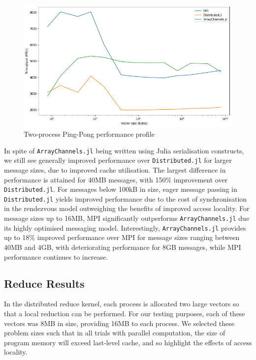 \begin{figure}[htb]
  \includegraphics[width=\linewidth]{figs/pingpong.png}
  \caption{Two-process Ping-Pong performance profile}
  \label{fig:plot-pingpong}
\end{figure}

In spite of \texttt{ArrayChannels.jl} being written using Julia
serialisation constructs, we still see generally improved performance
over \texttt{Distributed.jl} for larger message sizes, due to improved
cache utilisation. The largest difference in performance is attained for
40MB messages, with 150\% improvement over \texttt{Distributed.jl}. For
messages below 100kB in size, eager message passing in
\texttt{Distributed.jl} yields improved performance due to the cost of
synchronisation in the rendezvous model outweighing the benefits of
improved access locality. For message sizes up to 16MB, MPI
significantly outperforms \texttt{ArrayChannels.jl} due its highly
optimised messaging model. Interestingly, \texttt{ArrayChannels.jl}
provides up to 18\% improved performance over MPI for message sizes
ranging between 40MB and 4GB, with deteriorating performance for 8GB
messages, while MPI performance continues to increase.

\subsection{Reduce Results}
\label{sec:reduce-results}

In the distributed reduce kernel, each process is allocated two large
vectors so that a local reduction can be performed. For our testing
purposes, each of these vectors was 8MB in size, providing 16MB to each
process. We selected these problem sizes such that in all trials with
parallel computation, the size of program memory will exceed last-level
cache, and so highlight the effects of access locality.

